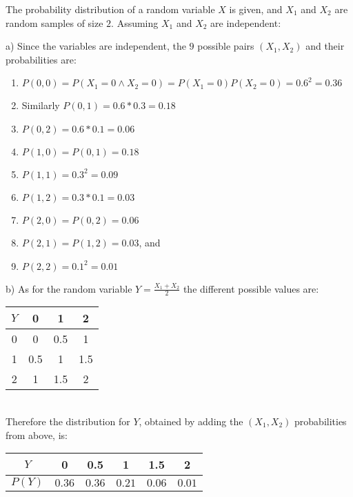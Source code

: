 \documentclass[boxes, qed]{homework}
\begin{document}
\newenvironment{amatrix}[1]{%
  \left[\begin{array}{@{}*{#1}{c}|c@{}}
}{%
  \end{array}\right]
}

\newenvironment{augmatrix}[1]{%
  \left[\begin{array}{#1}
}{%
  \end{array}\right]
}

\begin{problem}The probability distribution of a random variable
  $X$ is given, and $X_1$ and $X_2$ are random samples of size $2$.
  Assuming $X_1$ and $X_2$ are independent:
\end{problem}
\begin{solution}a) Since the variables are independent,
  the $9$ possible pairs $(X_1,X_2)$ and their probabilities are:
  \begin{enumerate}
    \item $P(0,0)=P(X_1=0 \land X_2=0)=P(X_1=0)P(X_2=0)=0.6^2=0.36$
    \item Similarly $P(0,1)=0.6*0.3=0.18$
    \item $P(0,2)=0.6*0.1=0.06$
    \item $P(1,0)=P(0,1)=0.18$
    \item $P(1,1)=0.3^2=0.09$
    \item $P(1,2)=0.3*0.1=0.03$
    \item $P(2,0)=P(0,2)=0.06$
    \item $P(2,1)=P(1,2)=0.03$, and
    \item $P(2,2)=0.1^2=0.01$\\
  \end{enumerate}

  b) As for the random variable $Y=\frac{X_1+X_2}{2}$
  the different possible values are:\\
  
  \begin{tabular}{|c|c|c|c|}
    \hline
    $Y$ & 0 & 1 & 2 \\
    \hline
    0 & 0 & 0.5 & 1 \\
    \hline
    1 & 0.5 & 1 & 1.5 \\
    \hline
    2 & 1 & 1.5 & 2 \\
    \hline
  \end{tabular}\\

  Therefore the distribution for $Y$, obtained by adding the
  $(X_1,X_2)$ probabilities from above, is:\\
  
  \begin{tabular}{|c|c|c|c|c|c|}
    \hline
    $Y$ & 0 & 0.5 & 1 & 1.5 & 2\\
    \hline
    $P(Y)$ & $0.36$ & $0.36$ & $0.21$ & $0.06$ & $0.01$\\
    \hline
  \end{tabular}
\end{solution}
\end{document}

